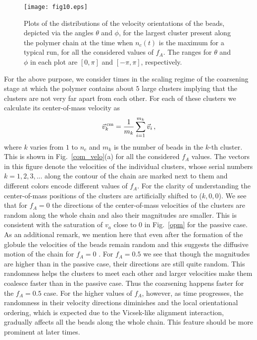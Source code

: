 \documentclass[aps,prx,reprint,showpacs,showkeys,noeprint,longbibliography]{revtex4-1} %
\begin{document}
\begin{figure}[t!]
	\centering
	\texttt{[image: fig10.eps]}
	\caption{\label{angle_distri} Plots of the distributions of the velocity 
orientations of the beads, 
		depicted via the angles $\theta$ and $\phi$, for the largest cluster present along the polymer chain at the time when $n_c(t)$ is the maximum for a typical run, 
		for all the considered values of $f_A$. The ranges for $\theta$ and $\phi$ in each 
plot are $[0,\pi]$ and $[-\pi,\pi]$, respectively.}
\end{figure}
\par
For the above purpose, we consider times in the scaling regime of the coarsening stage at which the polymer contains about $5$ large clusters  implying that the clusters are not very far apart from each other. For each of these clusters we calculate its center-of-mass velocity as
\begin{equation}
	\vec{v}_{k}^{\,\rm{cm}} = \frac{1}{m_k}\sum_{i=1}^{m_k}\vec{v}_i\,,
\end{equation}
where $k$ varies from $1$ to $n_c$ and $m_k$ is the number of beads in the $k$-th cluster. This is shown in Fig.~\ref{com_velo}(a) for all the considered $f_A$ values.  The vectors in this figure denote the velocities of the individual clusters, whose serial numbers $k=1, 2, 3, ...$ along the contour of the chain are marked next to them and different colors encode different values of $f_A$. For the clarity of understanding the center-of-mass positions of the clusters are artificially shifted to ($k,0,0$).  We see that for $f_A=0$ the directions of 
the center-of-mass velocities of the clusters are random along the whole chain and also their magnitudes are smaller. This is consistent with the saturation of $v_a$ close to $0$ in Fig.~\ref{opm} for the passive case. As an additional remark, we mention here that even after the formation of the globule the velocities of the beads remain random and this suggests the diffusive motion of the chain for $f_A=0$ \cite{paul_soft20}.
For $f_A=0.5$ we see that though the magnitudes are higher than  in the passive case, their directions are still quite random. 
This randomness helps the clusters to 
meet each other and larger velocities make them coalesce faster than in the passive case. Thus 
the coarsening happens faster for the $f_A=0.5$ case. For the higher values of $f_A$, however, as time progresses, the randomness in their velocity directions diminishes and
the local orientational ordering, which is expected due to the Vicsek-like  alignment interaction, gradually affects all the beads along the whole chain. This feature should be more prominent at later times.
\end{document}
